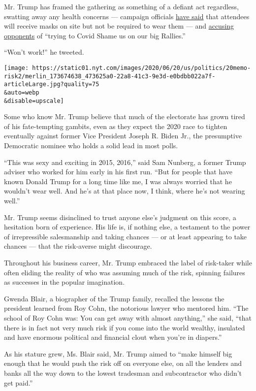 Mr. Trump has framed the gathering as something of a defiant act
regardless, swatting away any health concerns --- campaign officials
\href{https://www.nytimes.com/2020/06/17/us/politics/tulsa-rally-trump.html}{have
said} that attendees will receive masks on site but not be required to
wear them --- and
\href{https://twitter.com/realDonaldTrump/status/1272529858501976065}{accusing
opponents} of ``trying to Covid Shame us on our big Rallies.''

``Won't work!'' he tweeted.

\texttt{[image: https://static01.nyt.com/images/2020/06/20/us/politics/20memo-risk2/merlin\_173674638\_473625a0-22a8-41c3-9e3d-e0bdbb022a7f-articleLarge.jpg?quality=75\\\&auto=webp\\\&disable=upscale]}

Some who know Mr. Trump believe that much of the electorate has grown
tired of his fate-tempting gambits, even as they expect the 2020 race to
tighten eventually against former Vice President Joseph R. Biden Jr.,
the presumptive Democratic nominee who holds a solid lead in most polls.

``This was sexy and exciting in 2015, 2016,'' said Sam Nunberg, a former
Trump adviser who worked for him early in his first run. ``But for
people that have known Donald Trump for a long time like me, I was
always worried that he wouldn't wear well. And he's at that place now, I
think, where he's not wearing well.''

Mr. Trump seems disinclined to trust anyone else's judgment on this
score, a hesitation born of experience. His life is, if nothing else, a
testament to the power of irrepressible salesmanship and taking chances
--- or at least appearing to take chances --- that the risk-averse might
discourage.

Throughout his business career, Mr. Trump embraced the label of
risk-taker while often eliding the reality of who was assuming much of
the risk, spinning failures as successes in the popular imagination.

Gwenda Blair, a biographer of the Trump family, recalled the lessons the
president learned from Roy Cohn, the notorious lawyer who mentored him.
``The school of Roy Cohn was: You can get away with almost anything,''
she said, ``that there is in fact not very much risk if you come into
the world wealthy, insulated and have enormous political and financial
clout when you're in diapers.''

As his stature grew, Ms. Blair said, Mr. Trump aimed to ``make himself
big enough that he would push the risk off on everyone else, on all the
lenders and banks all the way down to the lowest tradesman and
subcontractor who didn't get paid.''

